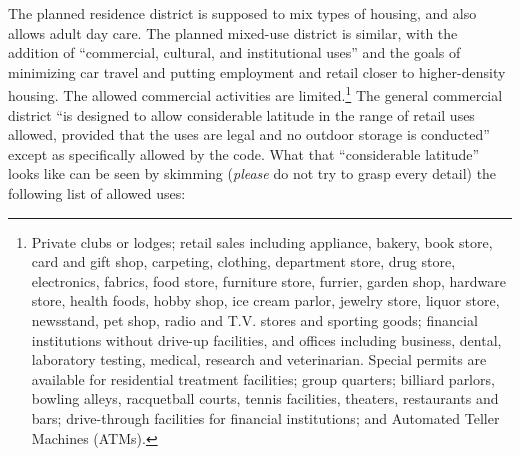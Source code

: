 The planned residence district is supposed to mix types of housing, and also
allows adult day care. The planned mixed-use district is similar, with the
addition of ``commercial, cultural, and institutional uses'' and the goals of
minimizing car travel and putting employment and retail closer to higher-density
housing. The allowed commercial activities are limited.\footnote{Private clubs
or lodges; retail sales including appliance, bakery, book store, card and gift
shop, carpeting, clothing, department store, drug store, electronics, fabrics,
food store, furniture store, furrier, garden shop, hardware store, health foods,
hobby shop, ice cream parlor, jewelry store, liquor store, newsstand, pet shop,
radio and T.V. stores and sporting goods; financial institutions without
drive-up facilities, and offices including business, dental, laboratory testing,
medical, research and veterinarian. Special permits are available for
residential treatment facilities; group quarters; billiard parlors, bowling
alleys, racquetball courts, tennis facilities, theaters, restaurants and bars;
drive-through facilities for financial institutions; and Automated Teller
Machines (ATMs).} The general commercial district ``is designed to allow
considerable latitude in the range of retail uses allowed, provided that the
uses are legal and no outdoor storage is conducted'' except as specifically
allowed by the code. What that ``considerable latitude'' looks like can be seen
by skimming (\textit{please} do not try to grasp every detail) the following
list of allowed uses: 
